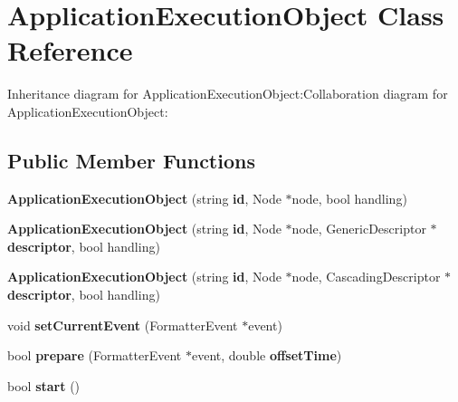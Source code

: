 \section{ApplicationExecutionObject Class Reference}
\label{classbr_1_1pucrio_1_1telemidia_1_1ginga_1_1ncl_1_1model_1_1components_1_1ApplicationExecutionObject}
Inheritance diagram for ApplicationExecutionObject:Collaboration diagram for ApplicationExecutionObject:\subsection*{Public Member Functions}
\begin{CompactItemize}
\item 
\textbf{ApplicationExecutionObject} (string {\bf id}, Node $\ast$node, bool handling)\label{classbr_1_1pucrio_1_1telemidia_1_1ginga_1_1ncl_1_1model_1_1components_1_1ApplicationExecutionObject_d6169f288080ad0f4619f023dfbc042f}

\item 
\textbf{ApplicationExecutionObject} (string {\bf id}, Node $\ast$node, GenericDescriptor $\ast${\bf descriptor}, bool handling)\label{classbr_1_1pucrio_1_1telemidia_1_1ginga_1_1ncl_1_1model_1_1components_1_1ApplicationExecutionObject_fb2ec0abce688be4d48e7c22b1f09353}

\item 
\textbf{ApplicationExecutionObject} (string {\bf id}, Node $\ast$node, CascadingDescriptor $\ast${\bf descriptor}, bool handling)\label{classbr_1_1pucrio_1_1telemidia_1_1ginga_1_1ncl_1_1model_1_1components_1_1ApplicationExecutionObject_8b2d7b587fe01487d386fe4b90add513}

\item 
void \textbf{setCurrentEvent} (FormatterEvent $\ast$event)\label{classbr_1_1pucrio_1_1telemidia_1_1ginga_1_1ncl_1_1model_1_1components_1_1ApplicationExecutionObject_de4aa1c8ab712eb3eef786af68214470}

\item 
bool \textbf{prepare} (FormatterEvent $\ast$event, double {\bf offsetTime})\label{classbr_1_1pucrio_1_1telemidia_1_1ginga_1_1ncl_1_1model_1_1components_1_1ApplicationExecutionObject_480a18449b619a46a8196c895a39dd68}

\item 
bool \textbf{start} ()\label{classbr_1_1pucrio_1_1telemidia_1_1ginga_1_1ncl_1_1model_1_1components_1_1ApplicationExecutionObject_ad5997aaaa2d622f0ca57f8b24a51a7b}


\end{CompactItemize}
